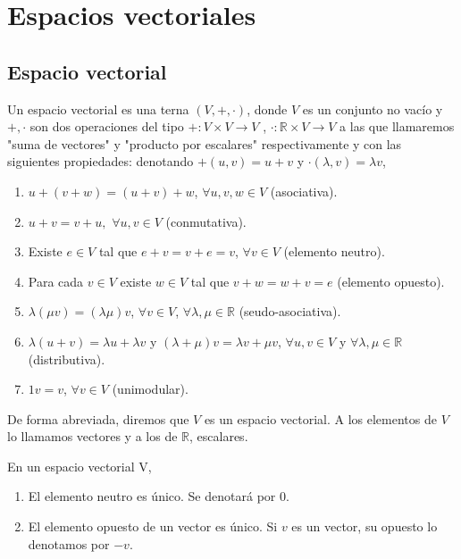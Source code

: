 \setlength{\parskip}{\baselineskip}%

\chapter{Espacios vectoriales}
	\section{Espacio vectorial}
		\begin{defi}
			Un espacio vectorial es una terna $ (V,+, \cdot) $, donde $ V $ es un conjunto no vacío y $+, \cdot$ son dos operaciones del tipo  $+:V\times V \to V$ , $\cdot:\mathbb{R}\times V  \to V$  a las que llamaremos "suma de vectores" y "producto 	por escalares" respectivamente y con las siguientes propiedades: denotando $ +(u, v) = u + v$  y  $\cdot  (\lambda, v) = \lambda v $,
		\end{defi}
		\begin{enumerate}
			\item $u + (v + w) = (u + v) + w$, $\forall u,v,w \in V$  (asociativa).
			\item $u + v = v + u, $ $\forall u,v \in V$ (conmutativa).
			\item Existe $e\in V$ tal que $e+v=v+e=v$, $ \forall v\in V$ (elemento neutro).
			\item Para cada $v\in V$ existe $w\in V$ tal que $v + w = w + v = e$ (elemento opuesto).
			\item $\lambda (\mu v)=(\lambda \mu)v$,  $\forall v\in V$, $\forall \lambda, \mu \in \mathbb{R}$ (seudo-asociativa).
			\item $\lambda (u+v)= \lambda u + \lambda v$ y $(\lambda + \mu )v= \lambda v + \mu v$, $\forall u,v \in V$  y  $\forall  \lambda, \mu \in \mathbb{R}$ (distributiva).
			\item $ 1v = v $, $\forall v \in V$ (unimodular).
		\end{enumerate}
		De forma abreviada, diremos que $V$ es un espacio vectorial. A los 	elementos de $V$
		lo llamamos vectores y a los de $\mathbb{R}$, escalares.\\[0.3cm]
		\begin{pro}
			En un espacio vectorial V,
		\begin{enumerate}
			\item El elemento neutro es único. Se denotará por 0.
			\item El elemento opuesto de un vector es único. Si $v$ es un vector, su opuesto lo denotamos por $-v$.
		\end{enumerate}
		\end{pro}
